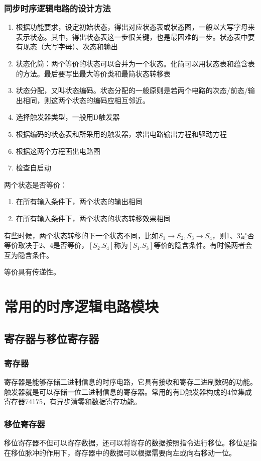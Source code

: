 \documentclass{ctexart}
\begin{document}
\subsubsection{同步时序逻辑电路的设计方法}
\begin{enumerate}
    \item 根据功能要求，设定初始状态，得出对应状态表或状态图，一般以大写字母来表示状态。其中，得出状态表这一步很关键，也是最困难的一步。状态表中要有现态（大写字母）、次态和输出
    \item 状态化简：两个等价的状态可以合并为一个状态。化简可以用状态表和蕴含表的方法。最后要写出最大等价类和最简状态转移表
    \item 状态分配，又叫状态编码。状态分配的一般原则是若两个电路的次态/前态/输出相同，则这两个状态的编码应相互邻近。
    \item 选择触发器类型，一般用D触发器
    \item 根据编码的状态表和所采用的触发器，求出电路输出方程和驱动方程
    \item 根据这两个方程画出电路图
    \item 检查自启动
\end{enumerate}
两个状态是否等价：
\begin{enumerate}
    \item 在所有输入条件下，两个状态的输出相同
    \item 在所有输入条件下，两个状态的状态转移效果相同
\end{enumerate}
有些时候，两个状态转移的下一个状态不同，比如$S_1\rightarrow S_2,S_3\rightarrow S_4$，则1、3是否等价取决于2、4是否等价，$[S_2.S_4]$称为$[S_1.S_3]$等价的隐含条件。有时候两者会互为隐含条件。

等价具有传递性。
\section{常用的时序逻辑电路模块}
\subsection{寄存器与移位寄存器}
\subsubsection{寄存器}
寄存器是能够存储二进制信息的时序电路，它具有接收和寄存二进制数码的功能。触发器就是可以存储一位二进制信息的寄存器。常用的有D触发器构成的4位集成寄存器74175，有异步清零和数据寄存功能。
\subsubsection{移位寄存器}
移位寄存器不但可以寄存数据，还可以将寄存的数据按照指令进行移位。移位是指在移位脉冲的作用下，寄存器中的数据可以根据需要向左或向右移动一位。
\end{document}
